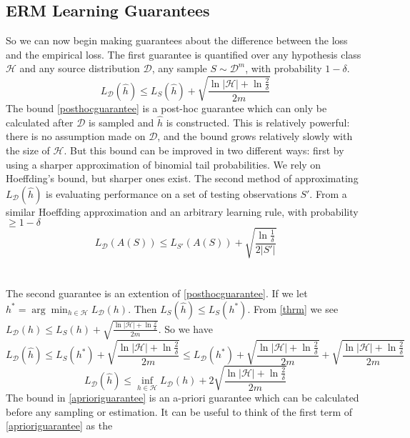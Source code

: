 \documentclass{article}
\newcommand{\D}{\mathcal{D}}
\newcommand{\h}{\mathcal{H}}
\begin{document}
  \subsection{ERM Learning Guarantees}
  So we can now begin making guarantees about the difference between the
  loss and the empirical loss. The first guarantee is quantified over
  any hypothesis class $\h$ and any source distribution $\D$, any sample
  $S \sim \D^m$, with probability $1 - \delta$.
  \begin{equation}\label{posthocguarantee}
      L_\D(\hat{h}) \leq L_S(\hat{h}) + \sqrt{\frac{\ln |\h| + \ln \frac{2}{\delta}}{2m}}
  \end{equation}
  The bound \eqref{posthocguarantee} is a
  post-hoc guarantee which can only be calculated after $\D$ is sampled and
  $\hat{h}$ is constructed. This is relatively powerful: there is no assumption
  made on $\D$, and the bound grows relatively slowly with the size of $\h$.
  But this bound can be improved in two different ways: first by using a sharper
  approximation of binomial tail probabilities. We rely on Hoeffding's bound,
  but sharper ones exist. The second method of approximating $L_\D(\hat{h})$
  is evaluating performance on a
  set of testing observations $S'$. From a similar Hoeffding approximation and
  an arbitrary learning rule, with probability $\geq 1 - \delta$
  \begin{equation}\label{testerrorbound}
    L_\D(A(S)) \leq L_{S'}(A(S)) + \sqrt{\frac{\ln\frac{1}{\delta}}{2|S'|}}
  \end{equation}
  \\
  \\
  The second guarantee is an extention of \eqref{posthocguarantee}. If we let
  $h^* = \arg \min_{h \in \h} L_\D (h)$. Then $L_S(\hat{h}) \leq L_S(h^*)$.
  From \eqref{thrm} we see $L_\D(h) \leq L_S(h) + \sqrt{\frac{\ln |\h| + \ln \frac{2}{\delta}}{2m}}$. So we have
  $$ L_\D(\hat{h}) \leq L_S(h^*)+ \sqrt{\frac{\ln |\h| +
  \ln \frac{2}{\delta}}{2m}} \leq L_\D(h^*) +
  \sqrt{\frac{\ln |\h| + \ln \frac{2}{\delta}}{2m}} +
  \sqrt{\frac{\ln |\h| + \ln \frac{2}{\delta}}{2m}}$$
  \begin{equation}\label{aprioriguarantee}
    L_\D(\hat{h}) \leq \inf_{h \in \h}L_\D(h) +
    2  \sqrt{\frac{\ln |\h| + \ln \frac{2}{\delta}}{2m}}
  \end{equation}
  The bound in \eqref{aprioriguarantee} is an a-priori
  guarantee which can be calculated before any sampling or estimation. It can
  be useful to think of the first term of \eqref{aprioriguarantee} as the
\end{document}
